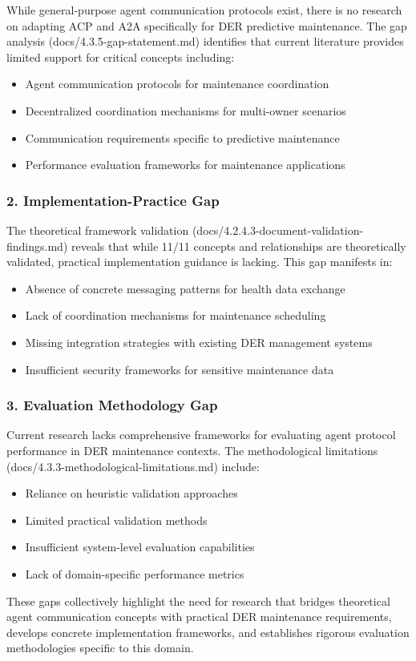 While general-purpose agent communication protocols exist, there is no research on adapting ACP and A2A specifically for DER predictive maintenance. The gap analysis (docs/4.3.5-gap-statement.md) identifies that current literature provides limited support for critical concepts including:
\begin{itemize}
\item Agent communication protocols for maintenance coordination
\item Decentralized coordination mechanisms for multi-owner scenarios
\item Communication requirements specific to predictive maintenance
\item Performance evaluation frameworks for maintenance applications
\end{itemize}

\subsubsection{2. Implementation-Practice Gap}

The theoretical framework validation (docs/4.2.4.3-document-validation-findings.md) reveals that while 11/11 concepts and relationships are theoretically validated, practical implementation guidance is lacking. This gap manifests in:
\begin{itemize}
\item Absence of concrete messaging patterns for health data exchange
\item Lack of coordination mechanisms for maintenance scheduling
\item Missing integration strategies with existing DER management systems
\item Insufficient security frameworks for sensitive maintenance data
\end{itemize}

\subsubsection{3. Evaluation Methodology Gap}

Current research lacks comprehensive frameworks for evaluating agent protocol performance in DER maintenance contexts. The methodological limitations (docs/4.3.3-methodological-limitations.md) include:
\begin{itemize}
\item Reliance on heuristic validation approaches
\item Limited practical validation methods
\item Insufficient system-level evaluation capabilities
\item Lack of domain-specific performance metrics
\end{itemize}

These gaps collectively highlight the need for research that bridges theoretical agent communication concepts with practical DER maintenance requirements, develops concrete implementation frameworks, and establishes rigorous evaluation methodologies specific to this domain.

